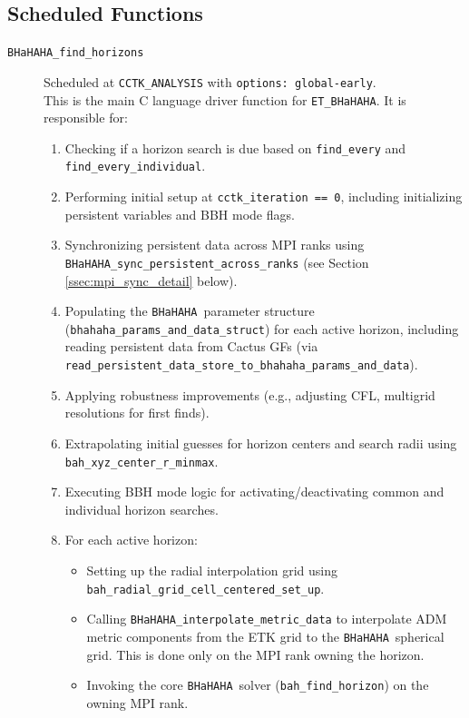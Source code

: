 \documentclass[a4paper,11pt]{article}
\newcommand{\thorn}[1]{{\tt #1}}
\newcommand{\BHaHAHA}{\thorn{ET\_BHaHAHA}} %
\newcommand{\bhahlib}{\texttt{BHaHAHA}} %
\begin{document}
\subsection{Scheduled Functions}
\begin{description}
    \item[\texttt{BHaHAHA\_find\_horizons}]
    Scheduled at \texttt{CCTK\_ANALYSIS} with \texttt{options: global-early}.
    \mbox{}\\ This is the main C language driver function for \BHaHAHA. It is responsible for:
    \begin{enumerate}
        \item Checking if a horizon search is due based on \texttt{find\_every} and \texttt{find\_every\_individual}.
        \item Performing initial setup at \texttt{cctk\_iteration == 0}, including initializing persistent variables and BBH mode flags.
        \item Synchronizing persistent data across MPI ranks using \texttt{BHaHAHA\_sync\_persistent\_across\_ranks} (see Section \ref{ssec:mpi_sync_detail} below).
        \item Populating the \bhahlib\ parameter structure (\texttt{bhahaha\_params\_and\_data\_struct}) for each active horizon, including reading persistent data from Cactus GFs (via \texttt{read\_persistent\_data\_store\_to\_bhahaha\_params\_and\_data}).
        \item Applying robustness improvements (e.g., adjusting CFL, multigrid resolutions for first finds).
        \item Extrapolating initial guesses for horizon centers and search radii using \texttt{bah\_xyz\_center\_r\_minmax}.
        \item Executing BBH mode logic for activating/deactivating common and individual horizon searches.
        \item For each active horizon:
            \begin{itemize}
                \item Setting up the radial interpolation grid using \texttt{bah\_radial\_grid\_cell\_centered\_set\_up}.
                \item Calling \texttt{BHaHAHA\_interpolate\_metric\_data} to interpolate ADM metric components from the ETK grid to the \bhahlib\ spherical grid. This is done only on the MPI rank owning the horizon.
                \item Invoking the core \bhahlib\ solver (\texttt{bah\_find\_horizon}) on the owning MPI rank.

\end{itemize}
\end{enumerate}
\end{description}
\end{document}

